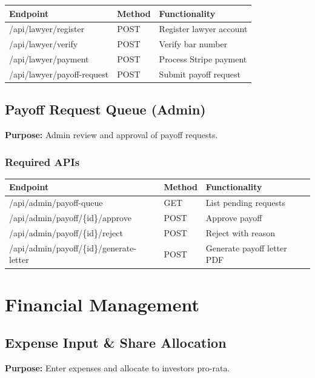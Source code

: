 \documentclass[11pt,a4paper]{article}
\begin{document}
\begin{longtable}{|p{5cm}|p{2cm}|p{6cm}|}
\hline
\textbf{Endpoint} & \textbf{Method} & \textbf{Functionality} \\
\hline
/api/lawyer/register & POST & Register lawyer account \\
/api/lawyer/verify & POST & Verify bar number \\
/api/lawyer/payment & POST & Process Stripe payment \\
/api/lawyer/payoff-request & POST & Submit payoff request \\
\hline
\end{longtable}

\subsection{Payoff Request Queue (Admin)}

\textbf{Purpose:} Admin review and approval of payoff requests.

\subsubsection{Required APIs}

\begin{longtable}{|p{5cm}|p{2cm}|p{6cm}|}
\hline
\textbf{Endpoint} & \textbf{Method} & \textbf{Functionality} \\
\hline
/api/admin/payoff-queue & GET & List pending requests \\
/api/admin/payoff/\{id\}/approve & POST & Approve payoff \\
/api/admin/payoff/\{id\}/reject & POST & Reject with reason \\
/api/admin/payoff/\{id\}/generate-letter & POST & Generate payoff letter PDF \\
\hline
\end{longtable}

\newpage

\section{Financial Management}

\subsection{Expense Input \& Share Allocation}

\textbf{Purpose:} Enter expenses and allocate to investors pro-rata.
\end{document}

